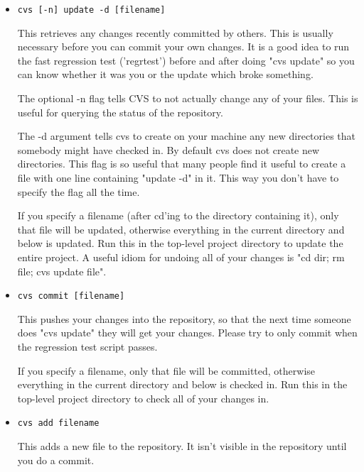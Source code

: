 \documentclass{article}
\def\t#1{{\tt #1}}
\begin{document}
\begin{itemize}
\item \t{cvs [-n] update -d [filename]}

    This retrieves any changes recently committed by others.  This is
    usually necessary before you can commit your own changes.  It is a
    good idea to run the fast regression test ('regrtest') before and
    after doing "cvs update" so you can know whether it was you or the
    update which broke something.

    The optional -n flag tells CVS to not actually change any of your
    files.  This is useful for querying the status of the repository.

    The -d argument tells cvs to create on your machine any new directories
    that somebody might have checked in. By default cvs does not create new
    directories. This flag is so useful that many people find it useful to
    create a  file with one line containing "update -d" in it.
    This way you don't have to specify the flag all the time.

    If you specify a filename (after cd'ing to the directory containing it),
    only that file will be updated, otherwise everything in the current
    directory and below is updated. Run this in the top-level project
    directory to update the entire project. A useful idiom for undoing all of
    your changes is "cd dir; rm file; cvs update file".

    
\item \t{cvs commit [filename]}

    This pushes your changes into the repository, so that the next time
    someone does "cvs update" they will get your changes.  Please try to
    only commit when the regression test script passes.
    
    If you specify a filename, only that file will be committed, otherwise
    everything in the current directory and below is checked in. Run this in
    the top-level project directory to check all of your changes in.

\item  \t{cvs add filename}

    This adds a new file to the repository.  It isn't visible in the
    repository until you do a commit.
\end{itemize}
 
\end{document}
